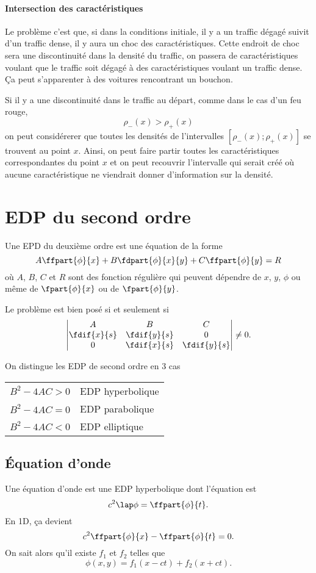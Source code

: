 \paragraph{Intersection des caractéristiques}
Le problème c'est que, si dans la conditions initiale,
il y a un traffic dégagé suivit d'un traffic dense,
il y aura un choc des caractéristiques.
Cette endroit de choc sera une discontinuité dans la densité du traffic,
on passera de caractéristiques voulant que le traffic soit dégagé à des
caractéristiques voulant un traffic dense.
Ça peut s'apparenter à des voitures rencontrant un bouchon.

Si il y a une discontinuité dans le traffic au départ,
comme dans le cas d'un feu rouge,
\[ \rho_-(x) > \rho_+(x) \]
on peut considérerer que toutes les densités de l'intervalles
$[\rho_-(x); \rho_+(x)]$ se trouvent au point $x$.
Ainsi, on peut faire partir toutes les caractéristiques correspondantes
du point $x$ et on peut recouvrir l'intervalle qui serait créé où
aucune caractéristique ne viendrait donner d'information sur la densité.

\section{EDP du second ordre}
Une EPD du deuxième ordre est une équation de la forme
\[ A \ffpart{\phi}{x} + B\fdpart{\phi}{x}{y} + C\ffpart{\phi}{y} = R \]
où $A$, $B$, $C$ et $R$ sont des fonction régulière qui peuvent
dépendre de $x$, $y$, $\phi$ ou même de $\fpart{\phi}{x}$ ou de
$\fpart{\phi}{y}$.

Le problème est bien posé si et seulement si
\[
  \begin{vmatrix}
    A & B & C\\
    \fdif{x}{s} & \fdif{y}{s} & 0\\
    0 & \fdif{x}{s} & \fdif{y}{s}
  \end{vmatrix}
  \neq 0.
\]

On distingue les EDP de second ordre en 3 cas
\begin{center}
  \begin{tabular}{|l|l|}
    \hline
    $B^2 - 4AC > 0$ & EDP hyperbolique\\
    $B^2 - 4AC = 0$ & EDP parabolique\\
    $B^2 - 4AC < 0$ & EDP elliptique\\
    \hline
  \end{tabular}
\end{center}

\subsection{Équation d'onde}
Une équation d'onde est une EDP hyperbolique dont l'équation est
\[ c^2 \lap \phi = \ffpart{\phi}{t}. \]
En 1D, ça devient
\[ c^2\ffpart{\phi}{x} - \ffpart{\phi}{t} = 0. \]
On sait alors qu'il existe $f_1$ et $f_2$ telles que
\[ \phi(x, y) = f_1(x - ct) + f_2(x + ct). \]

